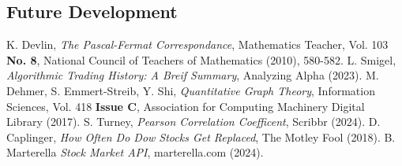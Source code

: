 \documentclass{article}
\begin{document}
\subsection{Future Development}



\begin{thebibliography}{99}
    K. Devlin, \emph{The Pascal-Fermat Correspondance}, Mathematics Teacher, Vol. 103 \textbf{No. 8}, National Council of Teachers of Mathematics (2010), 580-582.
    L. Smigel, \emph{Algorithmic Trading History: A Breif Summary}, Analyzing Alpha (2023).
    M. Dehmer, S. Emmert-Streib, Y. Shi, \emph{Quantitative Graph Theory}, Information Sciences, Vol. 418 \textbf{Issue C}, Association for Computing Machinery Digital Library (2017).
    S. Turney, \emph{Pearson Correlation Coefficent}, Scribbr (2024).
    D. Caplinger, \emph{How Often Do Dow Stocks Get Replaced}, The Motley Fool (2018).
    B. Marterella \emph{Stock Market API}, marterella.com (2024).
\end{thebibliography}

\clearpage
\end{document}
